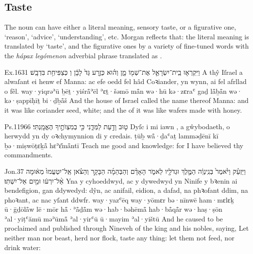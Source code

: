 \subsection{Taste}



\begin{paper}
	The noun  can have either a literal meaning, sensory taste, or a figurative one, ‘reason’, ‘advice’, ‘understanding’, etc. Morgan reflects that: the literal meaning is translated by  ‘taste’, and the figurative ones by a variety of fine-tuned words  with the \textit{hápax legómenon} adverbial phrase  translated as .
\end{paper}

\begin{example}{Ex.}{16}{31}{}{}
	\quoling
	{וַיִּקְרְא֧וּ בֵֽית־יִשְׂרָאֵ֛ל אֶת־שְׁמ֖וֹ מָ֑ן וְה֗וּא כְּזֶ֤רַע גַּד֙ לָבָ֔ן וְ כְּצַפִּיחִ֥ת בִּדְבָֽשׁ׃}
	{A thŷ Iſrael a alwaſant ei henw ef Manna: ac efe oedd fel hâd Coꝛiander, yn wynn, ai  fel afrllad o fêl.}
	{way·yiqrəʾū ḇēṯ·yiśrå̄ʾēl ʾɛṯ·šəmō må̄n wə·hū kə·zɛraʿ gaḏ lå̄ḇå̄n wə· kə·ṣappīḥīṯ bi·ḏḇå̄š}
	{And the house of Israel called the name thereof Manna: and it was like coriander seed, white; and the  of it was like wafers made with honey.}
\end{example}

\begin{example}{Ps.}{119}{66}{}{}
	\quoling
	{ט֤וּב  וָדַ֣עַת לַמְּדֵ֑נִי כִּ֖י בְמִצְוֺתֶ֣יךָ הֶאֱמָֽנְתִּי׃}
	{Dyſc i mi iawn , a gŵybodaeth, o herwydd yn dy oꝛchymynnion di y credais.}
	{ṭūḇ  wå̄·ḏaʿaṯ lamməḏēnī kī ḇə·miṣwōṯɛḵå̄ hɛʾɛ̆må̄ntī}
	{Teach me good  and knowledge: for I have believed thy commandments.}
\end{example}


\begin{example}{Jon.}{3}{7}{}{}
	\quoling
	{וַיַּזְעֵ֗ק וַיֹּ֙אמֶר֙ בְּנִֽינְוֵ֔ה  הַמֶּ֛לֶךְ וּגְדֹלָ֖יו לֵאמֹ֑ר הָאָדָ֨ם וְהַבְּהֵמָ֜ה הַבָּקָ֣ר וְהַצֹּ֗אן אַֽל־יִטְעֲמוּ֙ מְא֔וּמָה אַ֨ל־יִרְע֔וּ וּמַ֖יִם אַל־יִשְׁתּֽוּ׃}
	{Yna y cyhoeddwyd, ac y dywedwyd yn Ninife  y bꝛenin ai bendefigion, gan ddywedyd: dŷn, ac anifail, eidion, a dafad, na phꝛofant ddim, na phoꝛant, ac nac yſant ddwfr.}
	{way·yazʿēq way·yōmɛr bə·nīnwē  ham·mɛlɛḵ ū·ḡḏōlå̄w lē·mōr hå̄·ʾå̄ḏå̄m wə·hab·bəhēmå̄ hab·bå̄qå̄r wə·haṣ·ṣōn ʾal·yiṭʿămū məʾūmå̄ ʾal·yirʿū ū·mayim ʾal·yištū}
	{And he caused  to be proclaimed and published through Nineveh  of the king and his nobles, saying, Let neither man nor beast, herd nor flock, taste any thing: let them not feed, nor drink water:}
\end{example}
